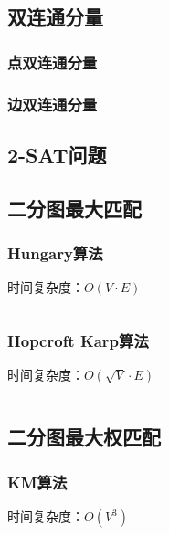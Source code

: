 \documentclass[a4paper]{article}
\newcommand{\cppcode}[1]{
    \inputminted[mathescape]{cpp}{source/#1}
}
\begin{document}

\subsection{双连通分量}

\subsubsection{点双连通分量}

\subsubsection{边双连通分量}

\subsection{2-SAT问题}


\subsection{二分图最大匹配}

\subsubsection{Hungary算法}

时间复杂度：$O(V \cdot E)$

\cppcode{graph-theory/maximum-matching-hungary.cpp}

\subsubsection{Hopcroft Karp算法}

时间复杂度：$O(\sqrt{V} \cdot E)$

\cppcode{graph-theory/maximum-matching-hopcroft-karp.cpp}

\subsection{二分图最大权匹配}

\subsubsection{KM算法}

时间复杂度：$O(V^3)$
\end{document}

